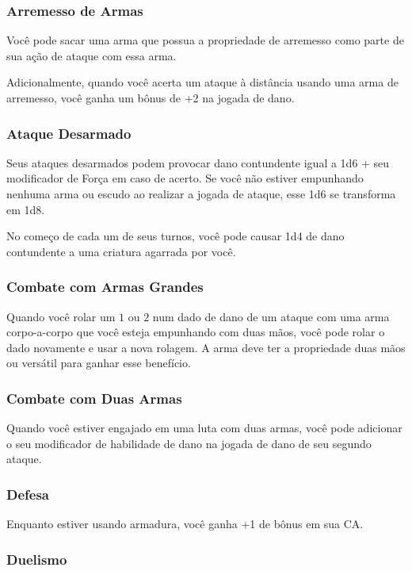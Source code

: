 \documentclass{RPG_Adventure}[2021/10/20]
\begin{document}
\begin{multicols}{2}
\subsubsection{Arremesso de Armas}%

Você pode sacar uma arma que possua a propriedade de arremesso como parte de sua
ação de ataque com essa arma.

Adicionalmente, quando você acerta um ataque à distância usando uma arma de
arremesso, você ganha um bônus de +2 na jogada de dano.

\subsubsection{Ataque Desarmado}%

Seus ataques desarmados podem provocar dano contundente igual a 1d6 + seu
modificador de Força em caso de acerto. Se você não estiver empunhando nenhuma
arma ou escudo ao realizar a jogada de ataque, esse 1d6 se transforma em 1d8.

No começo de cada um de seus turnos, você pode causar 1d4 de dano contundente a
uma criatura agarrada por você.

\subsubsection{Combate com Armas Grandes}%

Quando você rolar um $1$ ou $2$ num dado de dano de um ataque com uma arma
corpo-a-corpo que você esteja empunhando com duas mãos, você pode rolar o dado
novamente e usar a nova rolagem. A arma deve ter a propriedade duas mãos ou
versátil para ganhar esse benefício.

\subsubsection{Combate com Duas Armas}%

Quando você estiver engajado em uma luta com duas armas, você pode adicionar o
seu modificador de habilidade de dano na jogada de dano de seu segundo ataque.

\subsubsection{Defesa}%

Enquanto estiver usando armadura, você ganha +1 de bônus em sua CA.

\subsubsection{Duelismo}%


\end{multicols}
\end{document}
